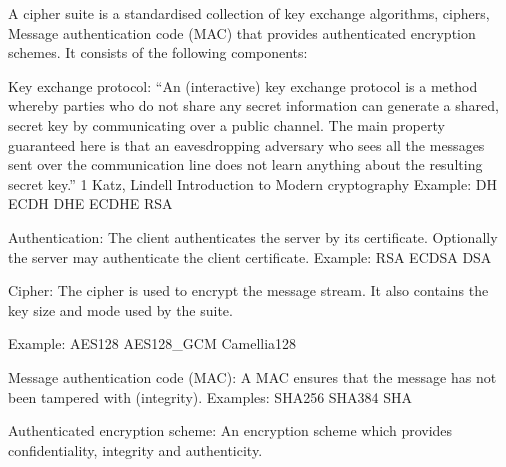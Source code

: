 
A cipher suite is a standardised collection of key exchange algorithms, ciphers,
Message authentication code (MAC) that provides authenticated encryption schemes. 
It consists of the following components:

\begin{description}
\item{Key exchange protocol:}
``An (interactive) key exchange protocol is a method whereby parties who do not 
share any secret information can generate a shared, secret key by communicating 
over a public channel. The main property guaranteed here is that an 
eavesdropping adversary who sees all the messages sent over the communication 
line does not learn anything about the resulting secret key.'' {1} 
Katz, Lindell Introduction to Modern cryptography
Example: DH ECDH DHE ECDHE RSA

\item{Authentication:}
The client authenticates the server by its certificate. Optionally the server 
may authenticate the client certificate.
Example: RSA ECDSA DSA

\item{Cipher:}
The cipher is used to encrypt the message stream. It also contains the key size
and mode used by the suite.

Example: AES128 AES128\_GCM Camellia128 


\item{Message authentication code (MAC):}
A MAC ensures that the message has not been tampered with (integrity).
Examples: SHA256 SHA384 SHA


\item{Authenticated encryption scheme:}
An encryption scheme which provides confidentiality, integrity and authenticity.

\end{description}